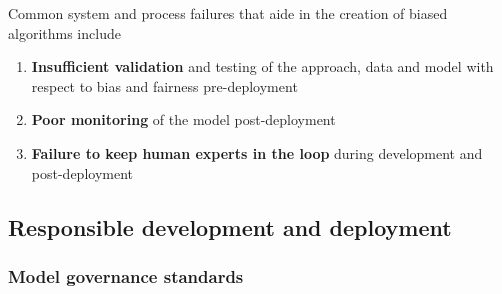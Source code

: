 Common system and process failures that aide in the creation of biased algorithms include
\begin{enumerate}[leftmargin=*]
\item \textbf{Insufficient validation} and testing of the approach, data and model with respect to bias and fairness pre-deployment
\item \textbf{Poor monitoring} of the model post-deployment
\item \textbf{Failure to keep human experts in the loop} during development and post-deployment
\end{enumerate}

\subsection*{Responsible development and deployment}

\subsubsection*{Model governance standards}

